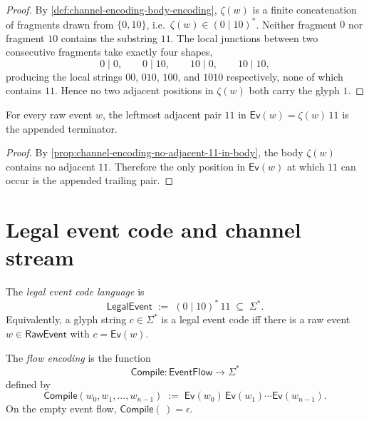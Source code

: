 \begin{proof}
By \autoref{def:channel-encoding-body-encoding}, $\zeta(w)$ is a finite concatenation of fragments drawn from $\{ 0, 10 \}$, i.e.\ $\zeta(w) \in (0 \mid 10)^{*}$. Neither fragment $0$ nor fragment $10$ contains the substring $11$. The local junctions between two consecutive fragments take exactly four shapes,
$$
  0\!\mid\!0,
  \qquad
  0\!\mid\!10,
  \qquad
  10\!\mid\!0,
  \qquad
  10\!\mid\!10,
$$
producing the local strings $00$, $010$, $100$, and $1010$ respectively, none of which contains $11$. Hence no two adjacent positions in $\zeta(w)$ both carry the glyph $1$.
\end{proof}

\begin{corollary}
\label{cor:channel-encoding-first-11-is-terminator}
For every raw event $w$, the leftmost adjacent pair $11$ in $\mathsf{Ev}(w) = \zeta(w)\,11$ is the appended terminator.
\end{corollary}

\begin{proof}
By \autoref{prop:channel-encoding-no-adjacent-11-in-body}, the body $\zeta(w)$ contains no adjacent $11$. Therefore the only position in $\mathsf{Ev}(w)$ at which $11$ can occur is the appended trailing pair.
\end{proof}

\section{Legal event code and channel stream}
\label{sec:channel-encoding-legal-language}

\begin{definition}
\label{def:channel-encoding-legal-event}
The \emph{legal event code language} is
$$
  \mathsf{LegalEvent} \;:=\; (0 \mid 10)^{*}\,11 \;\subseteq\; \Sigma^{*}.
$$
Equivalently, a glyph string $c \in \Sigma^{*}$ is a legal event code iff there is a raw event $w \in \mathsf{RawEvent}$ with $c = \mathsf{Ev}(w)$.
\end{definition}

\begin{definition}
\label{def:channel-encoding-flow-encoding}
The \emph{flow encoding} is the function
$$
  \mathsf{Compile} \colon \mathsf{EventFlow} \longrightarrow \Sigma^{*}
$$
defined by
$$
  \mathsf{Compile}(w_{0}, w_{1}, \ldots, w_{n-1})
  \;:=\;
  \mathsf{Ev}(w_{0})\,\mathsf{Ev}(w_{1}) \cdots \mathsf{Ev}(w_{n-1}).
$$
On the empty event flow, $\mathsf{Compile}(\,) = \epsilon$.
\end{definition}

